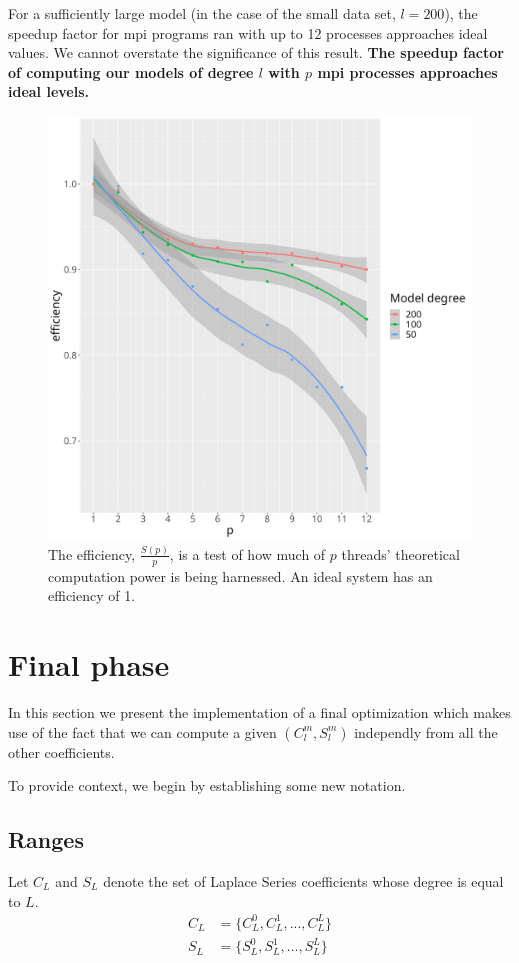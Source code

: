 \documentclass[a4paper]{article}
\theoremstyle{definition}
\begin{document}
For a sufficiently large model (in the case of the small data set, $l = 200$), the speedup factor for mpi programs ran with up to 12 processes approaches ideal values. We cannot
overstate the significance of this result. \textbf{The speedup factor of computing our models of degree $l$ with $p$ mpi processes approaches ideal levels.}

\begin{figure}
    \centering
    \includegraphics[width=0.5\linewidth]{media/mpi_efficieny.png}
    \caption{The efficiency, $\frac{S(p)}{p}$, is a test of how much of $p$ threads' theoretical computation power is
    being harnessed. An ideal system has an efficiency of 1.}

\end{figure}

\section{Final phase}

In this section we present the implementation of a final optimization which makes use of the fact that we can compute a given $(C_l^m, S_l^m)$
independly from all the other coefficients.

To provide context, we begin by establishing some new notation.

\subsection{Ranges}

Let $C_L$ and $S_L$ denote the set of Laplace Series coefficients whose degree is equal to $L$.
\begin{align*}
   C_L &= \{C_L^0, C_L^1, ..., C_L^L\} \\
   S_L &= \{S_L^0, S_L^1, ..., S_L^L\} 
\end{align*}
\end{document}
